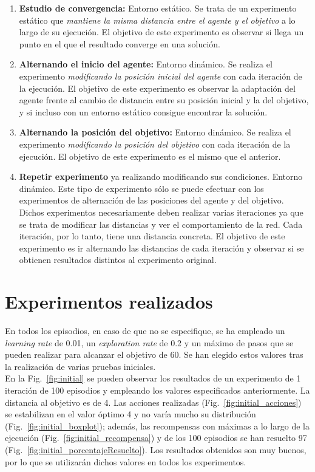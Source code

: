 \begin{enumerate}
    \item \textbf{Estudio de convergencia:} Entorno estático.  Se trata de un experimento estático que \textit{mantiene la misma distancia entre el agente y el objetivo} a lo largo de su ejecución. El objetivo de este experimento es observar si llega un punto en el que el resultado converge en una solución. 
    \item \textbf{Alternando el inicio del agente:} Entorno dinámico. Se realiza el experimento \textit{modificando la posición inicial del agente} con cada iteración de la ejecución. El objetivo de este experimento es observar la adaptación del agente frente al cambio de distancia entre su posición inicial y la del objetivo, y si incluso con un entorno estático consigue encontrar la solución.
    \item \textbf{Alternando la posición del objetivo:} Entorno dinámico. Se realiza el experimento \textit{modificando la posición del objetivo} con cada iteración de la ejecución. El objetivo de este experimento es el mismo que el anterior.
    \item \textbf{Repetir experimento} ya realizando modificando sus condiciones. Entorno dinámico. Este tipo de experimento sólo se puede efectuar con los experimentos de alternación de las posiciones del agente y del objetivo. Dichos experimentos necesariamente deben realizar varias iteraciones ya que se trata de modificar las distancias y ver el comportamiento de la red. Cada iteración, por lo tanto, tiene una distancia concreta. El objetivo de este experimento es ir alternando las distancias de cada iteración y observar si se obtienen resultados distintos al experimento original. 
\end{enumerate}

 
\section{Experimentos realizados}

En todos los episodios, en caso de que no se especifique, se ha empleado un \textit{learning rate} de 0.01, un \textit{exploration rate} de 0.2 y un máximo de pasos que se pueden realizar para alcanzar el objetivo de 60. Se han elegido estos valores tras la realización de varias pruebas iniciales. \\

En la Fig.~\ref{fig:initial} se pueden observar los resultados de un experimento de 1 iteración de 100 episodios y empleando los valores especificados anteriormente. La distancia al objetivo es de 4. Las acciones realizadas (Fig.~\ref{fig:initial_acciones}) se estabilizan en el valor óptimo 4 y no varía mucho su distribución (Fig.~\ref{fig:initial_boxplot}); además, las recompensas con máximas a lo largo de la ejecución (Fig.~\ref{fig:initial_recompensa}) y de los 100 episodios se han resuelto 97 (Fig.~\ref{fig:initial_porcentajeResuelto}). Los resultados obtenidos son muy buenos, por lo que se utilizarán dichos valores en todos los experimentos. \\

